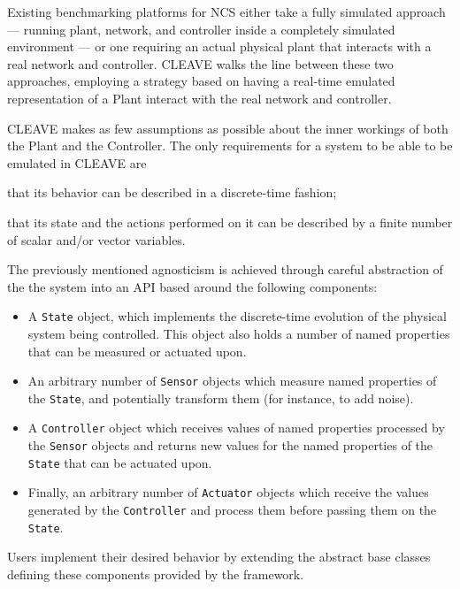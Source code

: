 \begin{description}[wide]
    \item[Emulation approach.] 
    Existing benchmarking platforms for NCS either take a fully simulated approach --- running plant, network, and controller inside a completely simulated environment --- or one requiring an actual physical plant that interacts with a real network and controller.
    CLEAVE walks the line between these two approaches, employing a strategy based on having a real-time emulated representation of a Plant interact with the real network and controller.
    \item[Plant- and Controller-agnosticism.] 
    CLEAVE makes as few assumptions as possible about the inner workings of both the Plant and the Controller. 
    The only requirements for a system to be able to be emulated in CLEAVE are
    \begin{enumerate*}[itemjoin*={{ and }}]
        \item that its behavior can be described in a discrete-time fashion;
        \item that its state and the actions performed on it can be described by a finite number of scalar and/or vector variables.
    \end{enumerate*} 


    \item[API based on well-defined components.]
    The previously mentioned agnosticism is achieved through careful abstraction of the the system into an API based around the following components:
    \begin{itemize}
        \item A \texttt{State} object, which implements the discrete-time evolution of the physical system being controlled.
        This object also holds a number of named properties that can be measured or actuated upon.
        \item An arbitrary number of \texttt{Sensor} objects which measure named properties of the \texttt{State}, and potentially transform them (for instance, to add noise).
        \item A \texttt{Controller} object which receives values of named properties processed by the \texttt{Sensor} objects and returns new values for the named properties of the \texttt{State} that can be actuated upon.
        \item Finally, an arbitrary number of \texttt{Actuator} objects which receive the values generated by the \texttt{Controller} and process them before passing them on the \texttt{State}.
    \end{itemize}
    Users implement their desired behavior by extending the abstract base classes defining these components provided by the framework.


\end{description}
